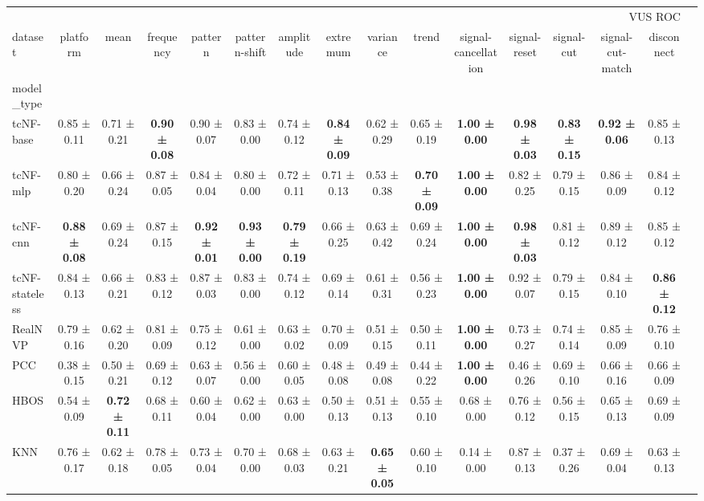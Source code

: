 \begin{tabular}{lccccccccccccccc}
\toprule
 & \multicolumn{14}{r}{VUS ROC} \\
dataset & platform & mean & frequency & pattern & pattern-shift & amplitude & extremum & variance & trend & signal-cancellation & signal-reset & signal-cut & signal-cut-match & disconnect \\
model_type &  &  &  &  &  &  &  &  &  &  &  &  &  &  \\
\midrule
tcNF-base & 0.85 ± 0.11 & 0.71 ± 0.21 & \bfseries 0.90 ± 0.08 & 0.90 ± 0.07 & 0.83 ± 0.00 & 0.74 ± 0.12 & \bfseries 0.84 ± 0.09 & 0.62 ± 0.29 & 0.65 ± 0.19 & \bfseries 1.00 ± 0.00 & \bfseries 0.98 ± 0.03 & \bfseries 0.83 ± 0.15 & \bfseries 0.92 ± 0.06 & 0.85 ± 0.13 \\
tcNF-mlp & 0.80 ± 0.20 & 0.66 ± 0.24 & 0.87 ± 0.05 & 0.84 ± 0.04 & 0.80 ± 0.00 & 0.72 ± 0.11 & 0.71 ± 0.13 & 0.53 ± 0.38 & \bfseries 0.70 ± 0.09 & \bfseries 1.00 ± 0.00 & 0.82 ± 0.25 & 0.79 ± 0.15 & 0.86 ± 0.09 & 0.84 ± 0.12 \\
tcNF-cnn & \bfseries 0.88 ± 0.08 & 0.69 ± 0.24 & 0.87 ± 0.15 & \bfseries 0.92 ± 0.01 & \bfseries 0.93 ± 0.00 & \bfseries 0.79 ± 0.19 & 0.66 ± 0.25 & 0.63 ± 0.42 & 0.69 ± 0.24 & \bfseries 1.00 ± 0.00 & \bfseries 0.98 ± 0.03 & 0.81 ± 0.12 & 0.89 ± 0.12 & 0.85 ± 0.12 \\
tcNF-stateless & 0.84 ± 0.13 & 0.66 ± 0.21 & 0.83 ± 0.12 & 0.87 ± 0.03 & 0.83 ± 0.00 & 0.74 ± 0.12 & 0.69 ± 0.14 & 0.61 ± 0.31 & 0.56 ± 0.23 & \bfseries 1.00 ± 0.00 & 0.92 ± 0.07 & 0.79 ± 0.15 & 0.84 ± 0.10 & \bfseries 0.86 ± 0.12 \\
RealNVP & 0.79 ± 0.16 & 0.62 ± 0.20 & 0.81 ± 0.09 & 0.75 ± 0.12 & 0.61 ± 0.00 & 0.63 ± 0.02 & 0.70 ± 0.09 & 0.51 ± 0.15 & 0.50 ± 0.11 & \bfseries 1.00 ± 0.00 & 0.73 ± 0.27 & 0.74 ± 0.14 & 0.85 ± 0.09 & 0.76 ± 0.10 \\
PCC & 0.38 ± 0.15 & 0.50 ± 0.21 & 0.69 ± 0.12 & 0.63 ± 0.07 & 0.56 ± 0.00 & 0.60 ± 0.05 & 0.48 ± 0.08 & 0.49 ± 0.08 & 0.44 ± 0.22 & \bfseries 1.00 ± 0.00 & 0.46 ± 0.26 & 0.69 ± 0.10 & 0.66 ± 0.16 & 0.66 ± 0.09 \\
HBOS & 0.54 ± 0.09 & \bfseries 0.72 ± 0.11 & 0.68 ± 0.11 & 0.60 ± 0.04 & 0.62 ± 0.00 & 0.63 ± 0.00 & 0.50 ± 0.13 & 0.51 ± 0.13 & 0.55 ± 0.10 & 0.68 ± 0.00 & 0.76 ± 0.12 & 0.56 ± 0.15 & 0.65 ± 0.13 & 0.69 ± 0.09 \\
KNN & 0.76 ± 0.17 & 0.62 ± 0.18 & 0.78 ± 0.05 & 0.73 ± 0.04 & 0.70 ± 0.00 & 0.68 ± 0.03 & 0.63 ± 0.21 & \bfseries 0.65 ± 0.05 & 0.60 ± 0.10 & 0.14 ± 0.00 & 0.87 ± 0.13 & 0.37 ± 0.26 & 0.69 ± 0.04 & 0.63 ± 0.13 \\

\end{tabular}

